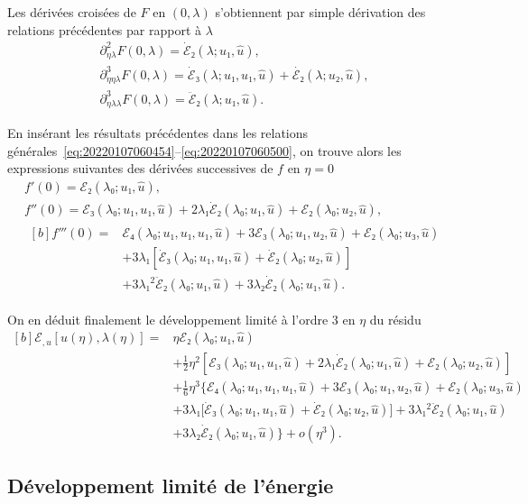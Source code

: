 \documentclass[12pt, final]{amsart}
\theoremstyle{definition}
\begin{document}
Les dérivées croisées de \(F\) en \((0, λ)\) s'obtiennent par simple dérivation
des relations précédentes par rapport à \(λ\)
\begin{gather}
  ∂_{ηλ}^2 F(0, λ) = \dot{ℰ}₂(λ; u₁, \hat{u}),\\
  ∂_{ηηλ}^3 F(0, λ) = \dot{ℰ}₃(λ; u₁, u₁, \hat{u}) + \dot{ℰ₂}(λ; u₂, \hat{u}),\\
  ∂_{ηλλ}^3 F(0, λ) = \ddot{ℰ}₂(λ; u₁, \hat{u}).
\end{gather}

En insérant les résultats précédentes dans les relations
générales~\eqref{eq:20220107060454}--\eqref{eq:20220107060500}, on trouve alors
les expressions suivantes des dérivées successives de \(f\) en \(η = 0\)
\begin{gather}
  f'(0) = ℰ₂(λ₀; u₁, \hat{u}),\\
  f''(0) = ℰ₃(λ₀; u₁, u₁, \hat{u}) + 2 λ₁ \dot{ℰ}₂(λ₀; u₁, \hat{u}) +ℰ₂(λ₀; u₂, \hat{u}),\\
  \begin{aligned}[b]
    f'''(0) ={}
    & ℰ₄(λ₀; u₁, u₁, u₁, \hat{u}) + 3ℰ₃(λ₀; u₁, u₂, \hat{u}) + ℰ₂(λ₀ ; u₃, \hat{u})\\
    & + 3 λ₁ [\dot{ℰ}₃(λ₀; u₁, u₁, \hat{u}) + \dot{ℰ}₂(λ₀; u₂, \hat{u})]\\
    & + 3 λ₁^2 \ddot{ℰ}₂(λ₀; u₁, \hat{u}) + 3 λ₂ \dot{ℰ}₂(λ₀; u₁, \hat{u}) .
  \end{aligned}
\end{gather}

On en déduit finalement le développement limité à l'ordre 3 en \(η\) du résidu
\begin{equation}
  \label{eq:20220107080901}
  \begin{aligned}[b]
    ℰ_{, u}[u(η), λ(η)] ={} & η ℰ₂(λ₀; u₁, \hat{u}) \\
    & + \tfrac{1}{2} η^2 [ℰ₃(λ₀; u₁, u₁, \hat{u}) + 2 λ₁ \dot{ℰ}₂(λ₀; u₁, \hat{u}) + ℰ₂(λ₀; u₂, \hat{u})]\\
    & + \tfrac{1}{6} η^3 \bigl\{ ℰ₄(λ₀; u₁, u₁, u₁, \hat{u}) + 3ℰ₃(λ₀; u₁, u₂, \hat{u}) + ℰ₂(λ₀; u₃, \hat{u})\\
    & + 3 λ₁ \bigl[\dot{ℰ}₃(λ₀; u₁, u₁, \hat{u}) + \dot{ℰ}₂(λ₀; u₂, \hat{u})\bigr] + 3 λ₁^2 \ddot{ℰ}₂(λ₀; u₁, \hat{u})\\
    &  + 3 λ₂ \dot{ℰ}₂(λ₀ ; u₁, \hat{u}) \bigr\} + o(η^3).
  \end{aligned}
\end{equation}

\subsection{Développement limité de l'énergie}
\end{document}
